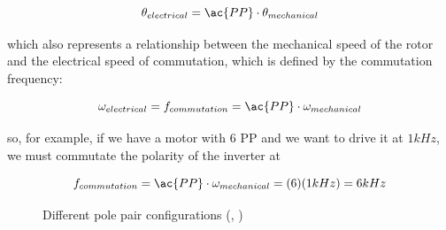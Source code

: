 \begin{equation}
	\label{eq:pole_pairs}
	\theta_{electrical} = \ac{PP} \cdot \theta_{mechanical}
\end{equation}

which also represents a relationship between the mechanical speed of the rotor and the electrical speed of commutation, which is defined by the commutation frequency:

\begin{equation}
	\label{eq:pole_pairs_2}
	\omega_{electrical} = f_{commutation} = \ac{PP} \cdot \omega_{mechanical}
\end{equation}

so, for example, if we have a motor with 6 \ac{PP} and we want to drive it at $1 kHz$, we must commutate the polarity of the inverter at 

\begin{equation}
	f_{commutation} = \ac{PP} \cdot \omega_{mechanical} = (6) (1 kHz) = 6 kHz
\end{equation}

\begin{figure}[htbp]
	\centering
    \hfill
    \hfill
    \caption[Different pole pair configurations]{Different pole pair configurations (\citeauthor{polepairs}, \citeyear{polepairs})}
    \label{fig:pole_pairs}
\end{figure}

